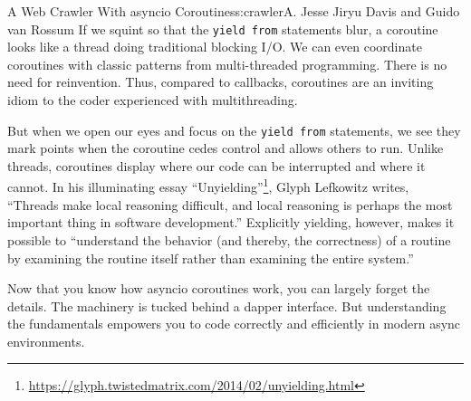 \begin{aosachapter}{A Web Crawler With asyncio Coroutines}{s:crawler}{A. Jesse Jiryu Davis and Guido van Rossum}
If we squint so that the \texttt{yield from} statements blur, a
coroutine looks like a thread doing traditional blocking I/O. We can
even coordinate coroutines with classic patterns from multi-threaded
programming. There is no need for reinvention. Thus, compared to
callbacks, coroutines are an inviting idiom to the coder experienced
with multithreading.

But when we open our eyes and focus on the \texttt{yield from}
statements, we see they mark points when the coroutine cedes control and
allows others to run. Unlike threads, coroutines display where our code
can be interrupted and where it cannot. In his illuminating essay
``Unyielding''\footnote{\url{https://glyph.twistedmatrix.com/2014/02/unyielding.html}},
Glyph Lefkowitz writes, ``Threads make local reasoning difficult, and
local reasoning is perhaps the most important thing in software
development.'' Explicitly yielding, however, makes it possible to
``understand the behavior (and thereby, the correctness) of a routine by
examining the routine itself rather than examining the entire system.''

Now that you know how asyncio coroutines work, you can largely forget
the details. The machinery is tucked behind a dapper interface. But
understanding the fundamentals empowers you to code correctly and
efficiently in modern async environments.

\end{aosachapter}
